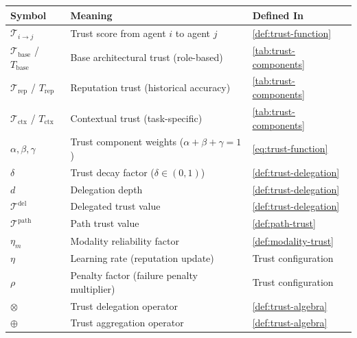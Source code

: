 \documentclass[
]{article}
\newcounter{none} %
\begin{document}
{\def\LTcaptype{none} %
\begin{longtable}[]{@{}
  >{\raggedright\arraybackslash}p{}
  >{\raggedright\arraybackslash}p{}
  >{\raggedright\arraybackslash}p{}@{}}
\toprule\noalign{}
\begin{minipage}[b]{\linewidth}\raggedright
Symbol
\end{minipage} & \begin{minipage}[b]{\linewidth}\raggedright
Meaning
\end{minipage} & \begin{minipage}[b]{\linewidth}\raggedright
Defined In
\end{minipage} \\
\midrule\noalign{}
\endhead
\bottomrule\noalign{}
\endlastfoot
\(\mathcal{T}_{i \to j}\) & Trust score from agent \(i\) to agent \(j\)
& \cref{def:trust-function} \\
\(\mathcal{T}_{\text{base}}\) / \(T_{\text{base}}\) & Base architectural
trust (role-based) & \cref{tab:trust-components} \\
\(\mathcal{T}_{\text{rep}}\) / \(T_{\text{rep}}\) & Reputation trust
(historical accuracy) & \cref{tab:trust-components} \\
\(\mathcal{T}_{\text{ctx}}\) / \(T_{\text{ctx}}\) & Contextual trust
(task-specific) & \cref{tab:trust-components} \\
\(\alpha, \beta, \gamma\) & Trust component weights
(\(\alpha + \beta + \gamma = 1\)) & \cref{eq:trust-function} \\
\(\delta\) & Trust decay factor (\(\delta \in (0, 1)\)) &
\cref{def:trust-delegation} \\
\(d\) & Delegation depth & \cref{def:trust-delegation} \\
\(\mathcal{T}^{\text{del}}\) & Delegated trust value &
\cref{def:trust-delegation} \\
\(\mathcal{T}^{\text{path}}\) & Path trust value &
\cref{def:path-trust} \\
\(\eta_m\) & Modality reliability factor & \cref{def:modality-trust} \\
\(\eta\) & Learning rate (reputation update) & Trust configuration \\
\(\rho\) & Penalty factor (failure penalty multiplier) & Trust
configuration \\
\(\otimes\) & Trust delegation operator & \cref{def:trust-algebra} \\
\(\oplus\) & Trust aggregation operator & \cref{def:trust-algebra} \\
\end{longtable}
}
\end{document}
